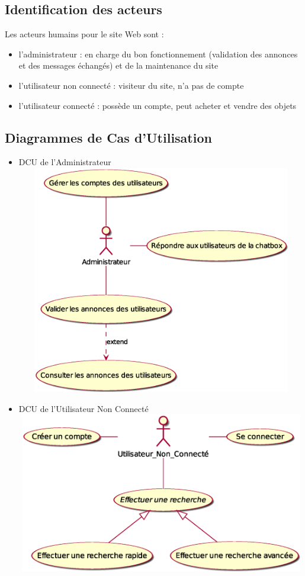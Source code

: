 {{	\subsection{Identification des acteurs}
	
	Les acteurs humains pour le site Web sont :
	\begin{itemize}
		\item l'administrateur : en charge du bon fonctionnement (validation des annonces et des messages échangés) et de la maintenance du site   
		\item l'utilisateur non connecté : visiteur du site, n'a pas de compte 
		\item l'utilisateur connecté : possède un compte, peut acheter et vendre des objets
	\end{itemize}
	
	\subsection{Diagrammes de Cas d'Utilisation}
	\begin{itemize}
		\item DCU de l'Administrateur \\ \includegraphics[height=10cm,width=15cm]{Images/DCU_Administrateur}
		\newpage
		\item DCU de l'Utilisateur Non Connecté \\
		\includegraphics[height=7cm,width=15cm]{Images/DCU_UtilisateurNonConnecte} 

\end{itemize}}}

